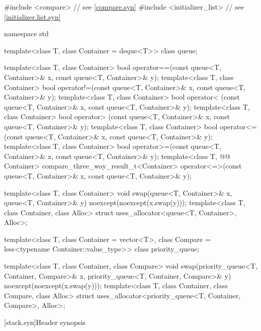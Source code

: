 \begin{codeblock}
#include <compare>              // see \ref{compare.syn}
#include <initializer_list>     // see \ref{initializer.list.syn}

namespace std {
  template<class T, class Container = deque<T>> class queue;

  template<class T, class Container>
    bool operator==(const queue<T, Container>& x, const queue<T, Container>& y);
  template<class T, class Container>
    bool operator!=(const queue<T, Container>& x, const queue<T, Container>& y);
  template<class T, class Container>
    bool operator< (const queue<T, Container>& x, const queue<T, Container>& y);
  template<class T, class Container>
    bool operator> (const queue<T, Container>& x, const queue<T, Container>& y);
  template<class T, class Container>
    bool operator<=(const queue<T, Container>& x, const queue<T, Container>& y);
  template<class T, class Container>
    bool operator>=(const queue<T, Container>& x, const queue<T, Container>& y);
  template<class T, @@ Container>
    compare_three_way_result_t<Container>
      operator<=>(const queue<T, Container>& x, const queue<T, Container>& y);

  template<class T, class Container>
    void swap(queue<T, Container>& x, queue<T, Container>& y) noexcept(noexcept(x.swap(y)));
  template<class T, class Container, class Alloc>
    struct uses_allocator<queue<T, Container>, Alloc>;

  template<class T, class Container = vector<T>,
           class Compare = less<typename Container::value_type>>
    class priority_queue;

  template<class T, class Container, class Compare>
    void swap(priority_queue<T, Container, Compare>& x,
              priority_queue<T, Container, Compare>& y) noexcept(noexcept(x.swap(y)));
  template<class T, class Container, class Compare, class Alloc>
    struct uses_allocator<priority_queue<T, Container, Compare>, Alloc>;
}
\end{codeblock}

[stack.syn]{Header  synopsis}

